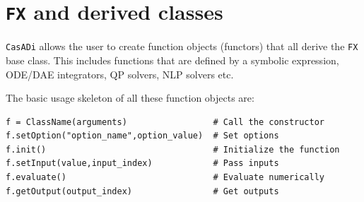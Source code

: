 \documentclass[a4paper,12pt]{book}
\newcommand{\CasADi}{\texttt{CasADi}\xspace}
\newcounter{pytexcount}
\newcounter{pytexsubcount}
\newenvironment{pytexTemplate}[1]{
\begin{rawhtml}
<div style="display:none">
\end{rawhtml}
}{
\begin{rawhtml}
</div>
\end{rawhtml}
}
\newcommand{\pytexStart}[1]{
  \addtocounter{pytexcount}{1}%
  \setcounter{pytexsubcount}{0}%
}
\renewenvironment{pytex}
{\addtocounter{pytexsubcount}{1}%
\begin{rawhtml}
<div style="color: black; background-color: \#b9c8db;  border-style: dotted; border-width: 1px; padding:2px;padding-left:1em" >
<pre>
\end{rawhtml}
}%
{\begin{rawhtml}
</pre>
</div>
<div style="color: black; background-color: \#fffff;  border-style: solid; border-width: 1px; padding:2px;padding-left:1em;margin-left:1em;" >\end{rawhtml}%
\verbatiminputeval{pytex_\alph{pytexcount}_\arabic{pytexsubcount}.log}%
\begin{rawhtml}
</div>
\end{rawhtml}
}
\begin{document}





\section{\texttt{FX} and derived classes} \label{sec:fx}
\CasADi allows the user to create function objects (functors) that all derive the \texttt{FX} base class. This includes functions that are defined by a symbolic expression, ODE/DAE integrators, QP solvers, NLP solvers etc.

The basic usage skeleton of all these function objects are:
\begin{verbatim}
f = ClassName(arguments)                 # Call the constructor
f.setOption("option_name",option_value)  # Set options
f.init()                                 # Initialize the function
f.setInput(value,input_index)            # Pass inputs
f.evaluate()                             # Evaluate numerically
f.getOutput(output_index)                # Get outputs
\end{verbatim}
\end{document}
